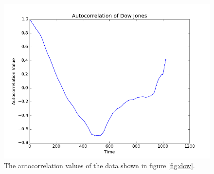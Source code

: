 \message{ !name(austin_report.tex)}\documentclass[11pt, letterpage, twocolumn]{article}
\begin{document}
\begin{figure}
  \includegraphics[width=\linewidth]{dow_ac.png}
  \caption{
    The autocorrelation values of the data shown in figure \ref{fig:dow}.
  }
  \label{fig:dow_ac}
\end{figure}
\end{document}
